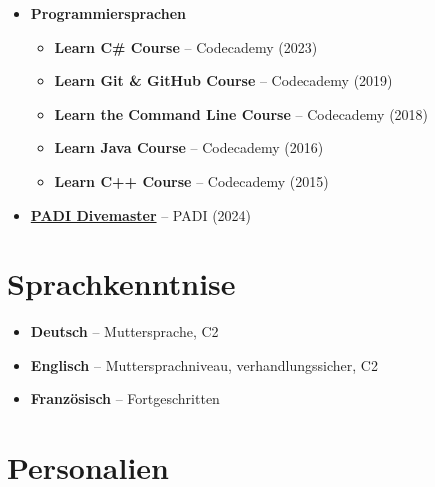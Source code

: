 \documentclass[a4paper,10pt]{article}
\begin{document}
\begin{itemize}
    \item[\faCode] \textbf{Programmiersprachen} \label{code}
    \begin{itemize}
        \item \textbf{Learn C\# Course} – Codecademy (2023)
        \item \textbf{Learn Git \& GitHub Course} – Codecademy (2019)
        \item \textbf{Learn the Command Line Course} – Codecademy (2018)
        \item \textbf{Learn Java Course} – Codecademy (2016)
        \item \textbf{Learn C++ Course} – Codecademy (2015)
    \end{itemize}

    \item[\faCompass] \textbf{\href{https://achievements.padi.com/faa80b73-a620-48a7-a8ed-d29169464eab}{PADI Divemaster}} – PADI (2024)
\end{itemize}

\newpage

\section*{Sprachkenntnise} \label{sec:languages}

\begin{itemize}
    \item \textbf{{Deutsch}} – Muttersprache, C2
    \item \textbf{{Englisch}} – Muttersprachniveau, verhandlungssicher, C2
    \item \textbf{{Französisch}} – Fortgeschritten 
\end{itemize}

\vspace{5pt}

\section*{Personalien} \label{sec:personal}
\end{document}
